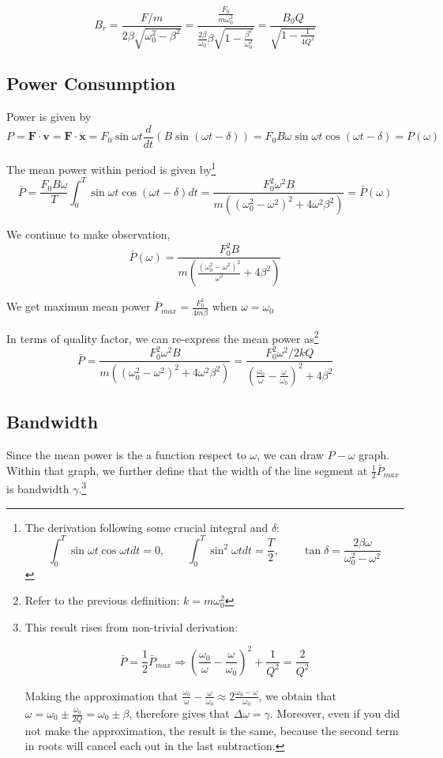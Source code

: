 \documentclass[openany]{book}
\begin{document}
\[B_r=\frac{F/m}{2\beta \sqrt{\omega _0^2-\beta ^2}}=\frac{\frac{F_0}{m\omega _0^2}}{\frac{2\beta }{\omega _0}\beta \sqrt{1-\frac{\beta ^2}{\omega _0^2}}}=\frac{B_0Q}{\sqrt{1-\frac{1}{4Q^2}}}\]

\subsection{Power Consumption}
Power is given by 
\[P=\mathbf{F}\cdot \mathbf{v}=\mathbf{F}\cdot \dot{\mathbf{x}}=F_0\sin \omega t \frac{d}{dt}\left(B\sin (\omega t-\delta )\right)=F_0B\omega \sin \omega t\cos (\omega t-\delta )=P(\omega )\]

The mean power within period is given by\footnote{The derivation following some crucial integral and $\delta $:
\[\int _{0}^{T}\sin \omega t\cos \omega tdt=0,\qquad \int _{0}^{T}\sin ^2\omega tdt=\frac{T}{2},\qquad \tan \delta =\frac{2\beta \omega }{\omega _0^2-\omega ^2}\]}
\[\bar{P}=\frac{F_0B\omega }{T}\int _{0}^{T}\sin \omega t\cos (\omega t-\delta )dt=\frac{F_0^2\omega ^2B}{m\left((\omega _0^2-\omega ^2)^2+4\omega ^2\beta ^2\right)}=\bar{P}(\omega )\]

We continue to make observation, 
\[\bar{P}(\omega )=\frac{F_0^2B}{m\left(\frac{(\omega _0^2-\omega ^2)^2}{\omega ^2}+4\beta ^2\right)}\]

We get maximun mean power $\bar{P}_{max}=\frac{F_0^2}{4m\beta }$ when $\omega =\omega _0$

In terms of quality factor, we can re-express the mean power as\footnote{Refer to the previous definition: $k=m\omega _0^2$}
\[\bar{P}=\frac{F_0^2\omega ^2B}{m\left((\omega _0^2-\omega ^2)^2+4\omega ^2\beta ^2\right)}=\frac{{F_0^2\omega ^2}/{2kQ}}{\left(\frac{\omega _0}{\omega }-\frac{\omega }{\omega _0}\right)^2+4\beta ^2}\]

\subsection{Bandwidth}
Since the mean power is the a function respect to $\omega $, we can draw $P-\omega $ graph. Within that graph, we further define that the width of the line segment at $\frac{1}{2}\bar{P}_{max}$ is bandwidth $\gamma $.\footnote{This result rises from non-trivial derivation:

\[\bar{P}=\frac{1}{2}\bar{P}_{max} \Rightarrow \left(\frac{\omega _0}{\omega }-\frac{\omega }{\omega _0}\right)^2+\frac{1}{Q^2}=\frac{2}{Q^2}\]

Making the approximation that $\frac{\omega _0}{\omega }-\frac{\omega }{\omega _0}\approx 2\frac{\omega _0-\omega}{\omega _0}$, we obtain that $\omega =\omega _0\pm \frac{\omega _0}{2Q}=\omega _0\pm \beta$, therefore gives that $\Delta \omega =\gamma$. Moreover, even if you did not make the approximation, the result is the same, because the second term in roots will cancel each out in the last subtraction. }
\end{document}
